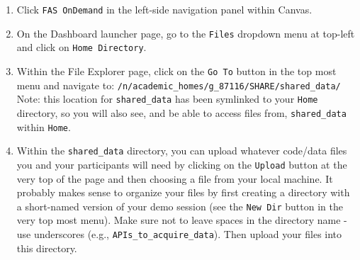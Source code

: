 \documentclass[]{book}
\providecommand{\tightlist}{%
  \setlength{\itemsep}{0pt}\setlength{\parskip}{0pt}}
\begin{document}
\begin{enumerate}
\def\labelenumi{\arabic{enumi}.}
\tightlist
\item
  Click \texttt{FAS\ OnDemand} in the left-side navigation panel within Canvas.
\item
  On the Dashboard launcher page, go to the \texttt{Files} dropdown menu at top-left and click on \texttt{Home\ Directory}.
\item
  Within the File Explorer page, click on the \texttt{Go\ To} button in the top most menu and navigate to: \texttt{/n/academic\_homes/g\_87116/SHARE/shared\_data/} Note: this location for \texttt{shared\_data} has been symlinked to your \texttt{Home} directory, so you will also see, and be able to access files from, \texttt{shared\_data} within \texttt{Home}.
\item
  Within the \texttt{shared\_data} directory, you can upload whatever code/data files you and your participants will need by clicking on the \texttt{Upload} button at the very top of the page and then choosing a file from your local machine. It probably makes sense to organize your files by first creating a directory with a short-named version of your demo session (see the \texttt{New\ Dir} button in the very top most menu). Make sure not to leave spaces in the directory name - use underscores (e.g., \texttt{APIs\_to\_acquire\_data}). Then upload your files into this directory.
\end{enumerate}
\end{document}
